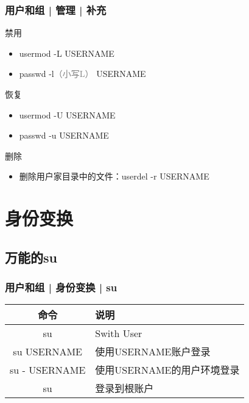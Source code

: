 \begin{frame}
  \frametitle{用户和组 | 管理 | 补充}
  \begin{block}{禁用}
    \begin{itemize}
      \item usermod -L USERNAME
      \item passwd -l\textcolor{gray}{（小写L）} USERNAME
    \end{itemize}
  \end{block}
  \pause
  \begin{block}{恢复}
    \begin{itemize}
      \item usermod -U USERNAME
      \item passwd -u USERNAME
    \end{itemize}
  \end{block}
  \pause
  \begin{block}{删除}
    \begin{itemize}
      \item 删除用户家目录中的文件：userdel -r USERNAME
    \end{itemize}
  \end{block}
\end{frame}

\section{身份变换}
\subsection{万能的su}
\begin{frame}
  \frametitle{用户和组 | 身份变换 | su}
  \begin{table}
    \centering
    \begin{tabular}{cl}
      \hline
      \rowcolor{blue!50}命令 & 说明\\
      \hline
      \alert{su} & Swith User\\
      \hline
      su USERNAME & 使用USERNAME账户登录\\
      su - USERNAME & 使用USERNAME的用户环境登录\\
      su & 登录到根账户\\
      \hline
    \end{tabular}
  \end{table}
\end{frame}


